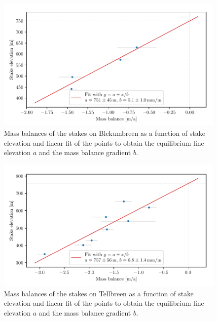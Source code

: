 \begin{table}[htb]
	\caption{Mass balance as result of the elevation fits from Fig.~\ref{GPS:fig:elev_tel} and
	mean values of the elevation measurements for all stakes on Tellbreen.
    The data in the table is plotted in Fig.~\ref{GPS:fig:elev_tel_mbg}.}
	\centering
	
	\label{GPS:tab:mbal_tel}
\end{table}

\begin{figure}[htb]
    \centering
    \includegraphics[width=\textwidth]{./figs/Elevation_Blekumbreen_mbg.pdf}
    \caption{Mass balances of the stakes on Blekumbreen as a function of stake elevation and linear fit of the points to obtain
    the equilibrium line elevation $a$ and the mass balance gradient $b$.}
    \label{GPS:fig:elev_ble_mbg}
\end{figure}


\begin{figure}[htb]
    \centering
    \includegraphics[width=\textwidth]{./figs/Elevation_Tellbreen_mbg.pdf}
    \caption{Mass balances of the stakes on Tellbreen as a function of stake elevation and linear fit of the points to obtain
    the equilibrium line elevation $a$ and the mass balance gradient $b$.}
    \label{GPS:fig:elev_tel_mbg}
\end{figure}

